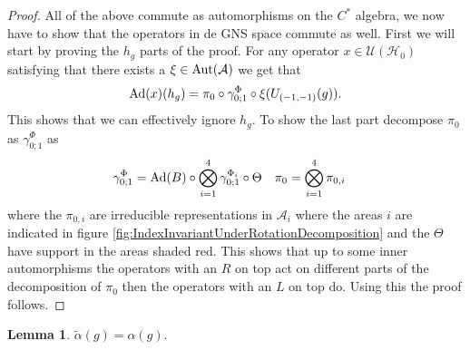 \documentclass[12pt,a4paper,twoside]{article}
\let\originalleft\left
\let\originalright\right
\renewcommand{\left}{\mathopen{}\mathclose\bgroup\originalleft}
\renewcommand{\right}{\aftergroup\egroup\originalright}
\newcommand{\UU}{\mathcal U}
\newcommand{\HH}{\mathcal H}
\renewcommand{\AA}{\mathcal A}
\newcommand{\Ad}[1]{\textrm{Ad}\left(#1\right)}
\newcommand{\Aut}[1]{\textrm{Aut}\left(#1\right)}
\theoremstyle{definition}
\newtheorem{lemma}[theorem]{Lemma}
\numberwithin{equation}{section}
\begin{document}
\begin{proof}
	All of the above commute as automorphisms on the $C^*$ algebra, we now have to show that the operators in de GNS space commute as well. First we will start by proving the $h_g$ parts of the proof. For any operator $x\in\UU(\HH_0)$ satisfying that there exists a $\xi\in\Aut{\AA}$ we get that
	\begin{equation}
		\Ad{x}(h_g)=\pi_0\circ\gamma^\Phi_{0;1}\circ\xi(U_{(-1,-1)}(g)).
	\end{equation}
	This shows that we can effectively ignore $h_g$. To show the last part decompose $\pi_0$ as $\gamma^\Phi_{0;1}$ as
	\begin{align}
		\gamma^\Phi_{0;1}&=\Ad{B}\circ\bigotimes_{i=1}^4\gamma^{\Phi_i}_{0;1}\circ\Theta&\pi_0&=\bigotimes_{i=1}^4\pi_{0,i}
	\end{align}
	where the $\pi_{0,i}$ are irreducible representations in $\AA_i$ where the areas $i$ are indicated in figure \ref{fig:IndexInvariantUnderRotationDecomposition} and the $\Theta$ have support in the areas shaded red. This shows that up to some inner automorphisms the operators with an $R$ on top act on different parts of the decomposition of $\pi_0$ then the operators with an $L$ on top do. Using this the proof follows.
\end{proof}
\begin{lemma}
	$\tilde{\alpha}(g)=\alpha(g)$.
\end{lemma}
\end{document}
